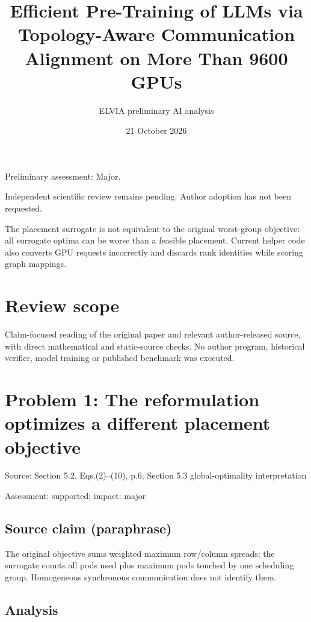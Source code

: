 \documentclass[11pt]{article}
\begin{document}
\title{Efficient Pre-Training of LLMs via Topology-Aware Communication Alignment on More Than 9600 GPUs}

\author{ELVIA preliminary AI analysis}\date{21 October 2026}\maketitle

Preliminary assessment: Major.\par

Independent scientific review remains pending. Author adoption has not been requested.

The placement surrogate is not equivalent to the original worst-group objective: all surrogate optima can be worse than a feasible placement. Current helper code also converts GPU requests incorrectly and discards rank identities while scoring graph mappings.

\section*{Review scope}

Claim-focused reading of the original paper and relevant author-released source, with direct mathematical and static-source checks. No author program, historical verifier, model training or published benchmark was executed.

\section*{Problem 1: The reformulation optimizes a different placement objective}

Source: Section 5.2, Eqs.(2)–(10), p.6; Section 5.3 global-optimality interpretation

Assessment: supported; impact: major

\subsection*{Source claim (paraphrase)}

The original objective sums weighted maximum row/column spreads; the surrogate counts all pods used plus maximum pods touched by one scheduling group. Homogeneous synchronous communication does not identify them.

\subsection*{Analysis}
\end{document}
